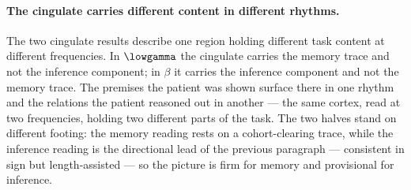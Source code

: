 %

\paragraph{The cingulate carries different content in different rhythms.}
The two cingulate results describe one region holding different task content at different frequencies. In \(\lowgamma\) the cingulate carries the memory trace and not the inference component; in \(\beta\) it carries the inference component and not the memory trace. The premises the patient was shown surface there in one rhythm and the relations the patient reasoned out in another --- the same cortex, read at two frequencies, holding two different parts of the task. The two halves stand on different footing: the memory reading rests on a cohort-clearing trace, while the inference reading is the directional lead of the previous paragraph --- consistent in sign but length-assisted --- so the picture is firm for memory and provisional for inference.
